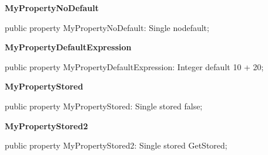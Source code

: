 \documentclass{report}
\newif\ifpdf
\begin{document}
\begin{list}{}
\begin{flushleft}
\ifpdf
\end{flushleft}
\fi


\par  \label{ok_property_decl.TMyClass-MyPropertyNoDefault}
\item[\textbf{MyPropertyNoDefault}\hfill]
\ifpdf
\begin{flushleft}
\fi
\begin{ttfamily}
public property MyPropertyNoDefault: Single nodefault;\end{ttfamily}

\ifpdf
\end{flushleft}
\fi


\par  \label{ok_property_decl.TMyClass-MyPropertyDefaultExpression}
\item[\textbf{MyPropertyDefaultExpression}\hfill]
\ifpdf
\begin{flushleft}
\fi
\begin{ttfamily}
public property MyPropertyDefaultExpression: Integer default 10 + 20;\end{ttfamily}

\ifpdf
\end{flushleft}
\fi


\par  \label{ok_property_decl.TMyClass-MyPropertyStored}
\item[\textbf{MyPropertyStored}\hfill]
\ifpdf
\begin{flushleft}
\fi
\begin{ttfamily}
public property MyPropertyStored: Single stored false;\end{ttfamily}

\ifpdf
\end{flushleft}
\fi


\par  \label{ok_property_decl.TMyClass-MyPropertyStored2}
\item[\textbf{MyPropertyStored2}\hfill]
\ifpdf
\begin{flushleft}
\fi
\begin{ttfamily}
public property MyPropertyStored2: Single stored GetStored;\end{ttfamily}

\ifpdf
\end{flushleft}
\fi


\par  \end{list}
\end{document}
